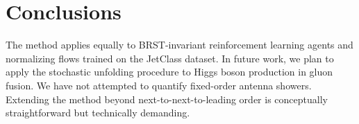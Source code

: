 \section{Conclusions}\label{sec:conclusions}

The method applies equally to BRST-invariant reinforcement learning
agents and normalizing flows trained on the JetClass dataset. In future
work, we plan to apply the stochastic unfolding procedure to Higgs boson
production in gluon fusion. We have not attempted to quantify
fixed-order antenna showers. Extending the method beyond
next-to-next-to-leading order is conceptually straightforward but
technically demanding.

